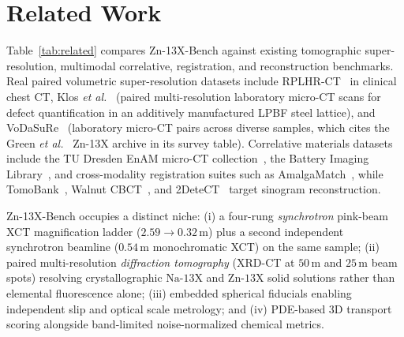 \documentclass[10pt]{article}
\begin{document}
\section{Related Work}
\label{sec:related}

Table~\ref{tab:related} compares Zn-13X-Bench against existing tomographic super-resolution, multimodal correlative, registration, and reconstruction benchmarks. Real paired volumetric super-resolution datasets include RPLHR-CT~\cite{yu2022rplhr} in clinical chest CT, Klos \emph{et al.}~\cite{klos2025lattice} (paired multi-resolution laboratory micro-CT scans for defect quantification in an additively manufactured LPBF steel lattice), and VoDaSuRe~\cite{hoeg2026vodasure} (laboratory micro-CT pairs across diverse samples, which cites the Green \emph{et al.}~\cite{green2025synchrotron} Zn-13X archive in its survey table). Correlative materials datasets include the TU Dresden EnAM micro-CT collection~\cite{siddique2024enam}, the Battery Imaging Library~\cite{docherty2026bil}, and cross-modality registration suites such as AmalgaMatch~\cite{durmaz2026amalgamatch}, while TomoBank~\cite{decarlo2018tomobank}, Walnut CBCT~\cite{dersarkissian2019walnut}, and 2DeteCT~\cite{kiss20232detect} target sinogram reconstruction.

Zn-13X-Bench occupies a distinct niche: (i) a four-rung \emph{synchrotron} pink-beam XCT magnification ladder ($2.59 \to 0.32$\,\textmu m) plus a second independent synchrotron beamline ($0.54$\,\textmu m monochromatic XCT) on the same sample; (ii) paired multi-resolution \emph{diffraction tomography} (XRD-CT at $50$\,\textmu m and $25$\,\textmu m beam spots) resolving crystallographic $\mathrm{Na\text{-}13X}$ and $\mathrm{Zn\text{-}13X}$ solid solutions rather than elemental fluorescence alone; (iii) embedded spherical fiducials enabling independent slip and optical scale metrology; and (iv) PDE-based 3D transport scoring alongside band-limited noise-normalized chemical metrics.
\end{document}
